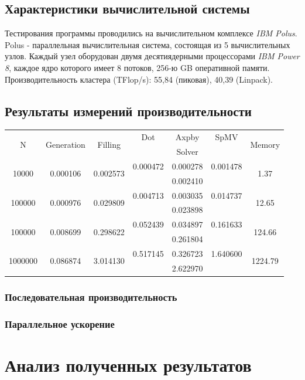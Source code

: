 	\subsection{Характеристики вычислительной системы}
	Тестирования программы проводились на вычислительном комплексе \textit{IBM Polus}. Polus - параллельная вычислительная система, состоящая из 5 вычислительных узлов. Каждый узел оборудован двумя десятиядерными процессорами \textit{IBM Power 8}, каждое ядро которого имеет 8 потоков, 256-ю GB оперативной памяти. Производительность кластера (TFlop/s): 55,84 (пиковая), 40,39 (Linpack).
	\subsection{Результаты измерений производительности}
			\begin{tabular}{|c||c|c|c|c|c|c|}
				\hline
				\multirow{2}{*}{N} &  \multirow{2}{*}{Generation} & \multirow{2}{*}{Filling} & Dot & Axpby & SpMV          & \multirow{2}{*}{Memory} \\ \cline{4-6}
				                   &                              &                         & \multicolumn{3}{c|}{Solver}  &                         \\ \hline
                \multirow{2}{*}{10000} & \multirow{2}{*}{0.000106} & \multirow{2}{*}{0.002573} & 0.000472 & 0.000278 & 0.001478              & \multirow{2}{*}{1.37} \\ \cline{4-6}
                                       &                     &                    & \multicolumn{3}{c|}{0.002410} &               \\ \hline
                \multirow{2}{*}{100000} &  \multirow{2}{*}{0.000976} & \multirow{2}{*}{0.029809} & 0.004713 & 0.003035 & 0.014737 & \multirow{2}{*}{12.65} \\ \cline{4-6}
                                      &                     &                     & \multicolumn{3}{c|}{0.023898} &  \\ \hline
                \multirow{2}{*}{100000} &  \multirow{2}{*}{0.008699} & \multirow{2}{*}{0.298622} & 0.052439 & 0.034897 & 0.161633 & \multirow{2}{*}{124.66} \\ \cline{4-6}
                                       &                     &                    & \multicolumn{3}{c|}{0.261804} &  \\ \hline
                \multirow{2}{*}{1000000} &  \multirow{2}{*}{0.086874} & \multirow{2}{*}{3.014130} & 0.517145 & 0.326723 & 1.640600 & \multirow{2}{*}{1224.79} \\ \cline{4-6}
                                       &                     &                    & \multicolumn{3}{c|}{2.622970} &  \\ \hline


				
			\end{tabular}
		\subsubsection{Последовательная производительность}
		\subsubsection{Параллельное ускорение}
\section{Анализ полученных результатов}

\clearpage
